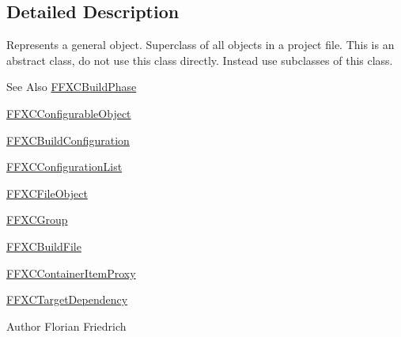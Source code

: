 \subsection{Detailed Description}
Represents a general object. Superclass of all objects in a project file. This is an abstract class, do not use this class directly. Instead use subclasses of this class. \begin{DoxySeeAlso}{See Also}
\hyperlink{interface_f_f_x_c_build_phase}{F\-F\-X\-C\-Build\-Phase} 

\hyperlink{interface_f_f_x_c_configurable_object}{F\-F\-X\-C\-Configurable\-Object} 

\hyperlink{interface_f_f_x_c_build_configuration}{F\-F\-X\-C\-Build\-Configuration} 

\hyperlink{interface_f_f_x_c_configuration_list}{F\-F\-X\-C\-Configuration\-List} 

\hyperlink{interface_f_f_x_c_file_object}{F\-F\-X\-C\-File\-Object} 

\hyperlink{interface_f_f_x_c_group}{F\-F\-X\-C\-Group} 

\hyperlink{interface_f_f_x_c_build_file}{F\-F\-X\-C\-Build\-File} 

\hyperlink{interface_f_f_x_c_container_item_proxy}{F\-F\-X\-C\-Container\-Item\-Proxy} 

\hyperlink{interface_f_f_x_c_target_dependency}{F\-F\-X\-C\-Target\-Dependency} 
\end{DoxySeeAlso}
\begin{DoxyAuthor}{Author}
Florian Friedrich 
\end{DoxyAuthor}


